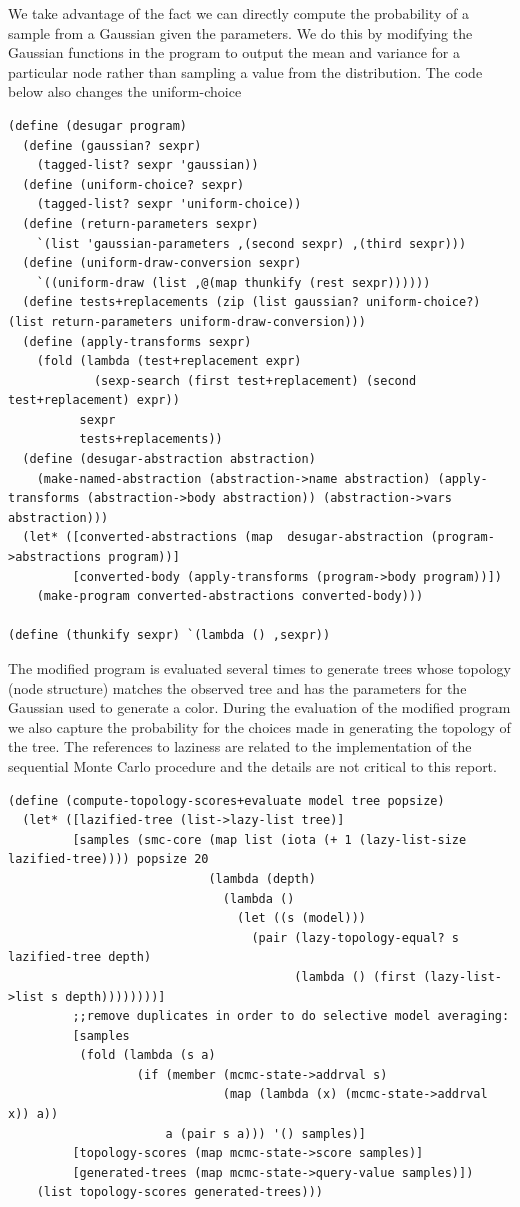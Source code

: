 \documentclass[a4paper,10pt]{article}
\begin{document}
We take advantage of the fact we can directly compute the probability of a sample from a Gaussian given the parameters.  We do this by modifying the Gaussian functions in the program to output the mean and variance for a particular node rather than sampling a value from the distribution.  The code below also changes the uniform-choice 
\begin{lstlisting}[frame=trBL]
(define (desugar program)
  (define (gaussian? sexpr)
    (tagged-list? sexpr 'gaussian))
  (define (uniform-choice? sexpr)
    (tagged-list? sexpr 'uniform-choice))
  (define (return-parameters sexpr)
    `(list 'gaussian-parameters ,(second sexpr) ,(third sexpr)))
  (define (uniform-draw-conversion sexpr)
    `((uniform-draw (list ,@(map thunkify (rest sexpr))))))
  (define tests+replacements (zip (list gaussian? uniform-choice?) (list return-parameters uniform-draw-conversion)))
  (define (apply-transforms sexpr)
    (fold (lambda (test+replacement expr)
            (sexp-search (first test+replacement) (second test+replacement) expr))
          sexpr
          tests+replacements))
  (define (desugar-abstraction abstraction)
    (make-named-abstraction (abstraction->name abstraction) (apply-transforms (abstraction->body abstraction)) (abstraction->vars abstraction)))
  (let* ([converted-abstractions (map  desugar-abstraction (program->abstractions program))]
         [converted-body (apply-transforms (program->body program))])
    (make-program converted-abstractions converted-body)))

(define (thunkify sexpr) `(lambda () ,sexpr))
\end{lstlisting}
The modified program is evaluated several times to generate trees whose topology (node structure) matches the observed tree and has the parameters for the Gaussian used to generate a color.  During the evaluation of the modified program we also capture the probability for the choices made in generating the topology of the tree.  The references to laziness are related to the implementation of the sequential Monte Carlo procedure and the details are not critical to this report.
\begin{lstlisting}[frame=trBL]
(define (compute-topology-scores+evaluate model tree popsize)
  (let* ([lazified-tree (list->lazy-list tree)]
         [samples (smc-core (map list (iota (+ 1 (lazy-list-size  lazified-tree)))) popsize 20
                            (lambda (depth)
                              (lambda ()
                                (let ((s (model)))
                                  (pair (lazy-topology-equal? s lazified-tree depth)
                                        (lambda () (first (lazy-list->list s depth))))))))]
         ;;remove duplicates in order to do selective model averaging:
         [samples
          (fold (lambda (s a)
                  (if (member (mcmc-state->addrval s)
                              (map (lambda (x) (mcmc-state->addrval x)) a))
                      a (pair s a))) '() samples)]
         [topology-scores (map mcmc-state->score samples)]
         [generated-trees (map mcmc-state->query-value samples)])
    (list topology-scores generated-trees)))
\end{lstlisting}
\end{document}
